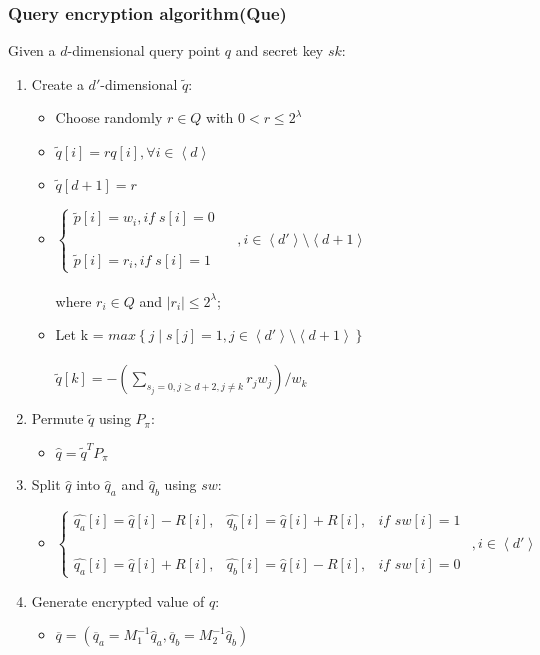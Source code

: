 \documentclass[12pt,english,hidelinks]{article}
\begin{document}
\subsubsection{Query encryption algorithm(Que)}
Given a $d$-dimensional query point $q$ and secret key $sk$:
\begin{enumerate}
\item Create a $d'$-dimensional $\tilde q$:
\begin{itemize}
    \item Choose randomly $r\in Q$ with $0<r\leq 2^\lambda$
    \item $\tilde{q}[i] = rq[i],\forall i \in \left \langle d \right \rangle$
    \item $\tilde{q}[d+1] = r$
    \item
    $\left\{\begin{matrix}
\tilde{p}[i] = w_i,if\;s[i] = 0 & &\\ 
 & & ,i\in \left \langle d' \right \rangle \setminus  \left \langle d+1 \right \rangle \\
\tilde{p}[i] = r_i,if\;s[i] = 1 & &
\end{matrix}\right.$
\\
\\
where $r_i\in Q$ and $\left|r_i\right|\leq 2^\lambda$;
    \item
    Let k = $max\left \{ j\mid s\left [ j \right ] = 1,j\in\left \langle d' \right \rangle\setminus \left \langle d+1 \right \rangle \right \}$
    \\
    \\
$    \tilde{q}\left [ k \right ] = -\left ( \sum\limits_{s_j=0,j\geq d+2,j\neq k}^{}r_{j}w_j\right)/w_k$
\end{itemize}
\item
Permute $\tilde{q}$ using $P_\pi$:
\begin{itemize}
\item 
$\hat{q} =\tilde{q}^{T}P_\pi $
\end{itemize}
\item
Split $\hat{q}$ into $\hat{q}_a$ and $\hat{q}_b$ using $sw$:
\begin{itemize}
\item 
$\left\{\begin{matrix}
 \hat{q_a}\left [ i \right ] = \hat{q}\left [ i \right ] - R\left [ i \right ],& \hat{q_b}\left [ i \right ] = \hat{q}\left [ i \right ] + R\left [ i \right ],&if\,\,sw\left [ i \right ]=1 &\\ 
 & & &,i\in \left \langle d' \right \rangle  \\
\hat{q_a}\left [ i \right ] = \hat{q}\left [ i \right ] + R\left [ i \right ],&
 \hat{q_b}\left [ i \right ] = \hat{q}\left [ i \right ] - R\left [ i \right ],&if\,\,sw\left [ i \right ]=0 &
\end{matrix}\right.$
\end{itemize}
\item
Generate encrypted value of $q$:
\begin{itemize}
\item $\overline{q}=\left ( \overline{q}_{a} = M^{-1}_{1}\hat{q}_{a},\overline{q}_{b} = M^{-1}_{2}\hat{q}_{b}\right )$
\end{itemize}
\end{enumerate}
\end{document}
